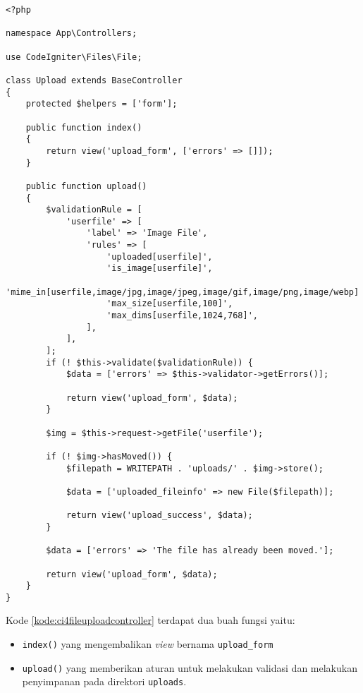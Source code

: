 \begin{lstlisting}[caption=Contoh kode \textit{controller} untuk melakukan validasi dan penyimpanan. ,label=kode:ci4fileuploadcontroller]
<?php

namespace App\Controllers;

use CodeIgniter\Files\File;

class Upload extends BaseController
{
    protected $helpers = ['form'];

    public function index()
    {
        return view('upload_form', ['errors' => []]);
    }

    public function upload()
    {
        $validationRule = [
            'userfile' => [
                'label' => 'Image File',
                'rules' => [
                    'uploaded[userfile]',
                    'is_image[userfile]',
                    'mime_in[userfile,image/jpg,image/jpeg,image/gif,image/png,image/webp]',
                    'max_size[userfile,100]',
                    'max_dims[userfile,1024,768]',
                ],
            ],
        ];
        if (! $this->validate($validationRule)) {
            $data = ['errors' => $this->validator->getErrors()];

            return view('upload_form', $data);
        }

        $img = $this->request->getFile('userfile');

        if (! $img->hasMoved()) {
            $filepath = WRITEPATH . 'uploads/' . $img->store();

            $data = ['uploaded_fileinfo' => new File($filepath)];

            return view('upload_success', $data);
        }

        $data = ['errors' => 'The file has already been moved.'];

        return view('upload_form', $data);
    }
}
\end{lstlisting}
Kode \ref{kode:ci4fileuploadcontroller} terdapat dua buah fungsi yaitu:
\begin{itemize}
\item \verb|index()| yang mengembalikan \textit{view} bernama \texttt{upload\_form}
\item \verb|upload()| yang memberikan aturan untuk melakukan validasi dan melakukan penyimpanan pada direktori \texttt{uploads}.
\end{itemize}

